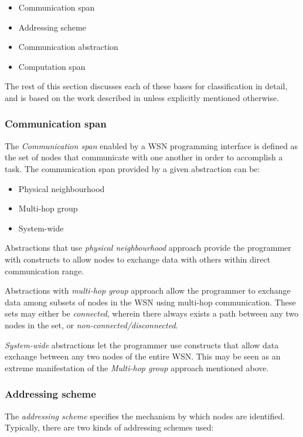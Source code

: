 \begin{itemize}
  \item Communication span
  \item Addressing scheme
  \item Communication abstraction
  \item Computation span
\end{itemize}

The rest of this section discusses each of these bases for classification in
detail, and is based on the work described in \cite{mottola_middleware:2008}
unless explicitly mentioned otherwise.

\subsubsection{Communication span}

The \emph{Communication span} enabled by a WSN programming interface is defined
as the set of nodes that communicate with one another in order to accomplish a
task. The communication span provided by a given abstraction can be:
\begin{itemize}
  \item Physical neighbourhood
  \item Multi-hop group
  \item System-wide
  
\end{itemize}
Abstractions that use \emph{physical neighbourhood} approach provide
  the programmer with constructs to allow nodes to exchange data with others
  within direct communication range.
  
Abstractions with \emph{multi-hop group} approach allow the
  programmer to exchange data among subsets of nodes in the WSN using
  multi-hop communication. These sets may either be
  \emph{connected}, wherein there always exists a path between any two nodes in
  the set, or \emph{non-connected/disconnected}.

\emph{System-wide} abstractions let the
  programmer use constructs that allow data exchange between any two nodes
  of the entire WSN. This may be seen as an extreme manifestation of the
  \emph{Multi-hop group} approach mentioned above.

\subsubsection{Addressing scheme}

The \emph{addressing scheme} specifies the mechanism by which nodes are
identified. Typically, there are two kinds of addressing schemes used:

